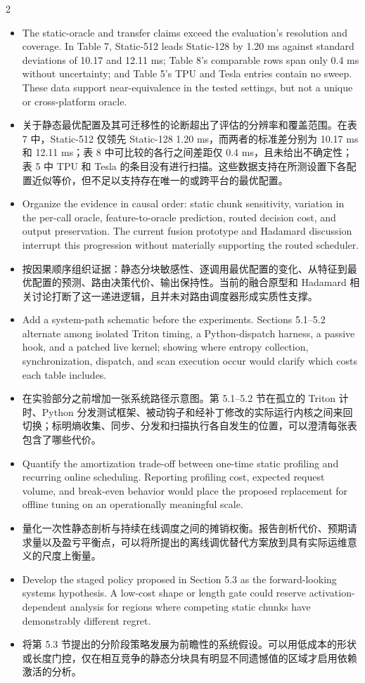 \documentclass[10pt,a4paper]{article}
\newcommand{\Pair}[2]{#1\par\switchcolumn #2\par\switchcolumn*}
\newcommand{\fieldhead}[1]{{\color{accent}\sffamily\bfseries #1}}
\newcommand{\PairHead}[2]{\Pair{\needspace{5\baselineskip}\fieldhead{#1}}%
                               {\needspace{5\baselineskip}\fieldhead{#2}}}
\newcommand{\PItem}[3]{\Pair{\begin{itemize}[label={#1}]\item #2\end{itemize}}%
                            {\begin{itemize}[label={#1}]\item #3\end{itemize}}}
\begin{document}
\begin{paracol}{2}
\PItem{\textbullet}{The static-oracle and transfer claims exceed the evaluation's
resolution and coverage. In Table 7, Static-512 leads Static-128 by 1.20 ms against
standard deviations of 10.17 and 12.11 ms; Table 8's comparable rows span only
0.4 ms without uncertainty; and Table 5's TPU and Tesla entries contain no sweep.
These data support near-equivalence in the tested settings, but not a unique or
cross-platform oracle.}
{关于静态最优配置及其可迁移性的论断超出了评估的分辨率和覆盖范围。在表 7 中，Static-512 仅领先 Static-128 1.20 ms，而两者的标准差分别为 10.17 ms 和 12.11 ms；表 8 中可比较的各行之间差距仅 0.4 ms，且未给出不确定性；表 5 中 TPU 和 Tesla 的条目没有进行扫描。这些数据支持在所测设置下各配置近似等价，但不足以支持存在唯一的或跨平台的最优配置。}

\PairHead{Suggestions for Improvement}{改进建议}

\PItem{\textbullet}{Organize the evidence in causal order: static chunk sensitivity,
variation in the per-call oracle, feature-to-oracle prediction, routed decision
cost, and output preservation. The current fusion prototype and Hadamard discussion
interrupt this progression without materially supporting the routed scheduler.}
{按因果顺序组织证据：静态分块敏感性、逐调用最优配置的变化、从特征到最优配置的预测、路由决策代价、输出保持性。当前的融合原型和 Hadamard 相关讨论打断了这一递进逻辑，且并未对路由调度器形成实质性支撑。}

\PItem{\textbullet}{Add a system-path schematic before the experiments. Sections
5.1--5.2 alternate among isolated Triton timing, a Python-dispatch harness, a passive
hook, and a patched live kernel; showing where entropy collection, synchronization,
dispatch, and scan execution occur would clarify which costs each table includes.}
{在实验部分之前增加一张系统路径示意图。第 5.1--5.2 节在孤立的 Triton 计时、Python 分发测试框架、被动钩子和经补丁修改的实际运行内核之间来回切换；标明熵收集、同步、分发和扫描执行各自发生的位置，可以澄清每张表包含了哪些代价。}

\PItem{\textbullet}{Quantify the amortization trade-off between one-time static
profiling and recurring online scheduling. Reporting profiling cost, expected
request volume, and break-even behavior would place the proposed replacement for
offline tuning on an operationally meaningful scale.}
{量化一次性静态剖析与持续在线调度之间的摊销权衡。报告剖析代价、预期请求量以及盈亏平衡点，可以将所提出的离线调优替代方案放到具有实际运维意义的尺度上衡量。}

\PItem{\textbullet}{Develop the staged policy proposed in Section 5.3 as the
forward-looking systems hypothesis. A low-cost shape or length gate could reserve
activation-dependent analysis for regions where competing static chunks have
demonstrably different regret.}
{将第 5.3 节提出的分阶段策略发展为前瞻性的系统假设。可以用低成本的形状或长度门控，仅在相互竞争的静态分块具有明显不同遗憾值的区域才启用依赖激活的分析。}


\end{paracol}
\end{document}
